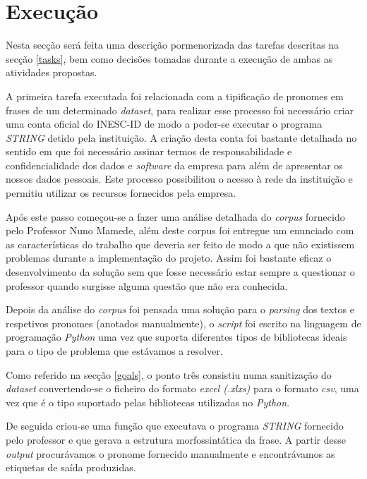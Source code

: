 \documentclass[a4paper,12pt,journal,twoside,compsoc]{PPIEEEtran}
\begin{document}
\section{Execução}
\label{execution}

Nesta secção será feita uma descrição pormenorizada das tarefas descritas na secção \ref{tasks}, bem como decisões tomadas durante a execução de ambas as atividades propostas.

A primeira tarefa executada foi relacionada com a tipificação de pronomes em frases de um determinado \textit{dataset}, para realizar esse processo foi necessário criar uma conta oficial do INESC-ID de modo a poder-se executar o programa \textit{STRING} detido pela instituição. A criação desta conta foi bastante detalhada no sentido em que foi necessário assinar termos de responsabilidade e confidencialidade dos dados e \textit{software} da empresa para além de apresentar os nossos dados pessoais. Este processo possibilitou o acesso à rede da instituição e permitiu utilizar os recursos fornecidos pela empresa.

Após este passo começou-se a fazer uma análise detalhada do \textit{corpus} fornecido pelo Professor Nuno Mamede, além deste corpus foi entregue um enunciado com as características do trabalho que deveria ser feito de modo a que não existissem problemas durante a implementação do projeto. Assim foi bastante eficaz o desenvolvimento da solução sem que fosse necessário estar sempre a questionar o professor quando surgisse alguma questão que não era conhecida.

Depois da análise do \textit{corpus} foi pensada uma solução para o \textit{parsing} dos textos e respetivos pronomes (anotados manualmente), o \textit{script} foi escrito na linguagem de programação \textit{Python} uma vez que suporta diferentes tipos de bibliotecas ideais para o tipo de problema que estávamos a resolver. 

Como referido na secção \ref{goals}, o ponto três consistiu numa sanitização do \textit{dataset} convertendo-se o ficheiro do formato \textit{excel (.xlxs)} para o formato \textit{csv}, uma vez que é o tipo suportado pelas bibliotecas utilizadas no \textit{Python}.

De seguida criou-se uma função que executava o programa \textit{STRING} fornecido pelo professor e que gerava a estrutura morfossintática da frase. A partir desse \textit{output} procurávamos o pronome fornecido manualmente e encontrávamos as etiquetas de saída produzidas.
\end{document}
